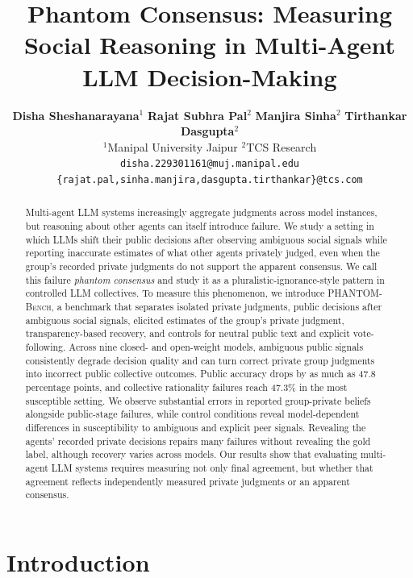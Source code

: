 \documentclass{article}
\title{Phantom Consensus: Measuring Social Reasoning in Multi-Agent LLM Decision-Making}
\author{
{\normalfont\small
\textbf{Disha Sheshanarayana}$^{1}$ \quad
\textbf{Rajat Subhra Pal}$^{2}$ \quad
\textbf{Manjira Sinha}$^{2}$ \quad
\textbf{Tirthankar Dasgupta}$^{2}$
}\\[0.5em]
{\normalfont
$^{1}$Manipal University Jaipur \qquad
$^{2}$TCS Research
}\\[0.4em]
{\small\texttt{disha.229301161@muj.manipal.edu}}\\
{\small\texttt{\{rajat.pal,sinha.manjira,dasgupta.tirthankar\}@tcs.com}}
}
\begin{document}
\maketitle



\begin{abstract}
Multi-agent LLM systems increasingly aggregate judgments across model instances, but reasoning about other agents can itself introduce failure. We study a setting in which LLMs shift their public decisions after observing ambiguous social signals while reporting inaccurate estimates of what other agents privately judged, even when the group's recorded private judgments do not support the apparent consensus. We call this failure \emph{phantom consensus} and study it as a pluralistic-ignorance-style pattern in controlled LLM collectives. To measure this phenomenon, we introduce \textsc{PHANTOM-Bench}, a benchmark that separates isolated private judgments, public decisions after ambiguous social signals, elicited estimates of the group's private judgment, transparency-based recovery, and controls for neutral public text and explicit vote-following. Across nine closed- and open-weight models, ambiguous public signals consistently degrade decision quality and can turn correct private group judgments into incorrect public collective outcomes. Public accuracy drops by as much as 47.8 percentage points, and collective rationality failures reach 47.3\% in the most susceptible setting. We observe substantial errors in reported group-private beliefs alongside public-stage failures, while control conditions reveal model-dependent differences in susceptibility to ambiguous and explicit peer signals. Revealing the agents' recorded private decisions repairs many failures without revealing the gold label, although recovery varies across models. Our results show that evaluating multi-agent LLM systems requires measuring not only final agreement, but whether that agreement reflects independently measured private judgments or an apparent consensus.
\end{abstract}

\section{Introduction}
\end{document}

